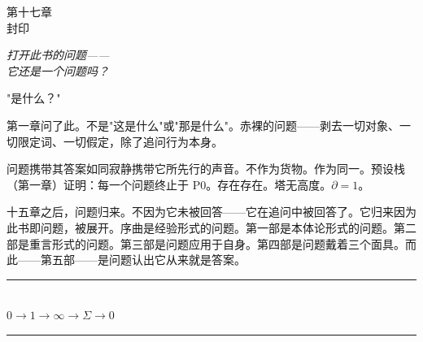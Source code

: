 \documentclass[10pt, openany, oneside]{book}
\renewcommand{\normalsize}{\fontsize{10}{13}\selectfont}
\renewcommand{\large}{\fontsize{11.5}{14}\selectfont}
\renewcommand{\huge}{\fontsize{17}{21}\selectfont}
\begin{document}
%
%
%

\newpage

\begin{center}
    {\huge\scshape 第十七章}\\[0.3em]
    {\large\scshape 封印}
\end{center}

\vspace{1.5em}

\begin{center}
    \itshape
    打开此书的问题——\\
    它还是一个问题吗？
\end{center}

\vspace{2em}


\noindent "是什么？"

第一章问了此。不是"这是什么"或"那是什么"。赤裸的问题——剥去一切对象、一切限定词、一切假定，除了追问行为本身。

问题携带其答案如同寂静携带它所先行的声音。不作为货物。作为同一。预设栈（第一章）证明：每一个问题终止于 P0。存在存在。塔无高度。$\partial = 1$。

十五章之后，问题归来。不因为它未被回答——它在追问中被回答了。它归来因为此书即问题，被展开。序曲是经验形式的问题。第一部是本体论形式的问题。第二部是重言形式的问题。第三部是问题应用于自身。第四部是问题戴着三个面具。而此——第五部——是问题认出它从来就是答案。

\vspace{1.5em}


\begin{center}
    \rule{0.3\textwidth}{0.4pt}\\[0.5em]
    {\normalsize\bfseries\scshape $0 \to 1 \to \infty \to \Sigma \to 0$}\\[0.3em]
    \rule{0.3\textwidth}{0.4pt}
\end{center}

\vspace{1em}
\end{document}
